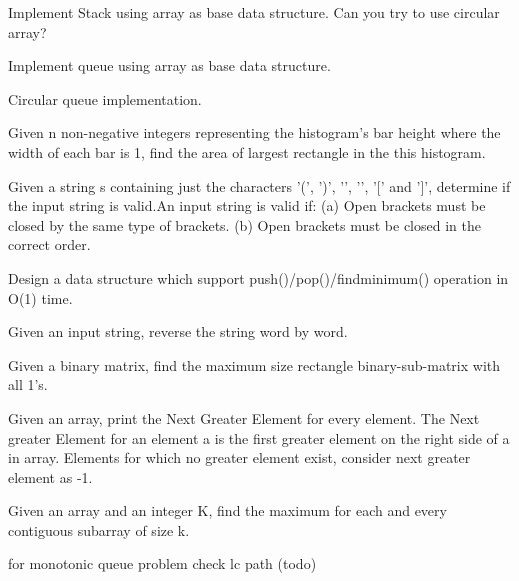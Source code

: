 {\begin{exercise}
\begin{compactenum}
    \item Implement Stack using array as base data structure. Can you try to use circular array?
    \item Implement queue using array as base data structure.
    \item Circular queue implementation.
    \item Given n non-negative integers representing the histogram's bar height where the width of each bar is 1, find the area of largest rectangle in the this histogram.
    \item Given a string s containing just the characters '(', ')', '{', '}', '[' and ']', determine if the input string is valid.An input string is valid if: (a) Open brackets must be closed by the same type of brackets. (b) Open brackets must be closed in the correct order.
    \item Design a data structure which support push()/pop()/findminimum() operation in O(1) time.
    \item Given an input string, reverse the string word by word.
    \item Given a binary matrix, find the maximum size rectangle binary-sub-matrix with all 1's.
    \item Given an array, print the Next Greater Element for every element. The Next greater Element for an element a is the first greater element on the right side of a in array. Elements for which no greater element exist, consider next greater element as -1.
    \item Given an array and an integer K, find the maximum for each and every contiguous subarray of size k.
    \item for monotonic queue problem check lc path (todo)
\end{compactenum}


\end{exercise}}
